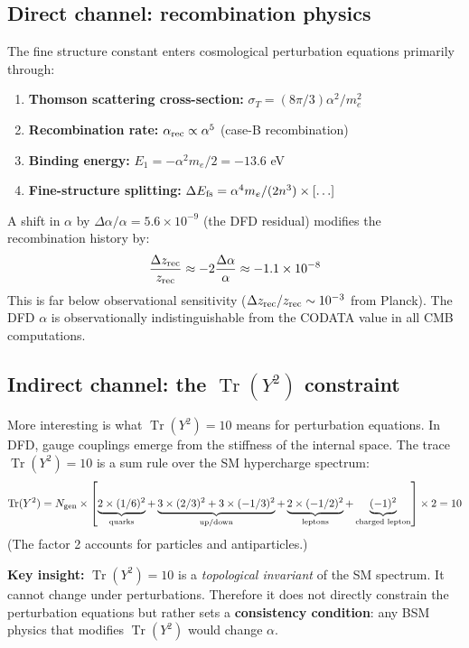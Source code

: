 \documentclass[11pt,a4paper]{article}
\newcommand{\Tr}{\operatorname{Tr}}
\begin{document}
\subsection{Direct channel: recombination physics}

The fine structure constant enters cosmological perturbation equations primarily through:

\begin{enumerate}
\item \textbf{Thomson scattering cross-section:} $\sigma_T = (8\pi/3)\alpha^2/m_e^2$
\item \textbf{Recombination rate:} $\alpha_{\rm rec} \propto \alpha^5$ (case-B recombination)
\item \textbf{Binding energy:} $E_1 = -\alpha^2 m_e/2 = -13.6$ eV
\item \textbf{Fine-structure splitting:} $\Delta E_{\rm fs} = \alpha^4 m_e / (2n^3) \times [\ldots]$
\end{enumerate}

A shift in $\alpha$ by $\Delta\alpha/\alpha = 5.6 \times 10^{-9}$ (the DFD residual) modifies the recombination history by:
\begin{equation}
\frac{\Delta z_{\rm rec}}{z_{\rm rec}} \approx -2\frac{\Delta\alpha}{\alpha} \approx -1.1 \times 10^{-8}
\end{equation}
This is far below observational sensitivity ($\Delta z_{\rm rec}/z_{\rm rec} \sim 10^{-3}$ from Planck). The DFD $\alpha$ is observationally indistinguishable from the CODATA value in all CMB computations.

\subsection{Indirect channel: the $\Tr(Y^2)$ constraint}

More interesting is what $\Tr(Y^2) = 10$ means for perturbation equations. In DFD, gauge couplings emerge from the stiffness of the internal space. The trace $\Tr(Y^2) = 10$ is a sum rule over the SM hypercharge spectrum:
\begin{equation}
\Tr(Y^2) = N_{\rm gen} \times \left[\underbrace{2 \times (1/6)^2}_{\text{quarks}} + \underbrace{3 \times (2/3)^2 + 3 \times (-1/3)^2}_{\text{up/down}} + \underbrace{2 \times (-1/2)^2}_{\text{leptons}} + \underbrace{(-1)^2}_{\text{charged lepton}}\right] \times 2 = 10
\end{equation}
(The factor 2 accounts for particles and antiparticles.)

\textbf{Key insight:} $\Tr(Y^2) = 10$ is a \emph{topological invariant} of the SM spectrum. It cannot change under perturbations. Therefore it does not directly constrain the perturbation equations but rather sets a \textbf{consistency condition}: any BSM physics that modifies $\Tr(Y^2)$ would change $\alpha$.
\end{document}
